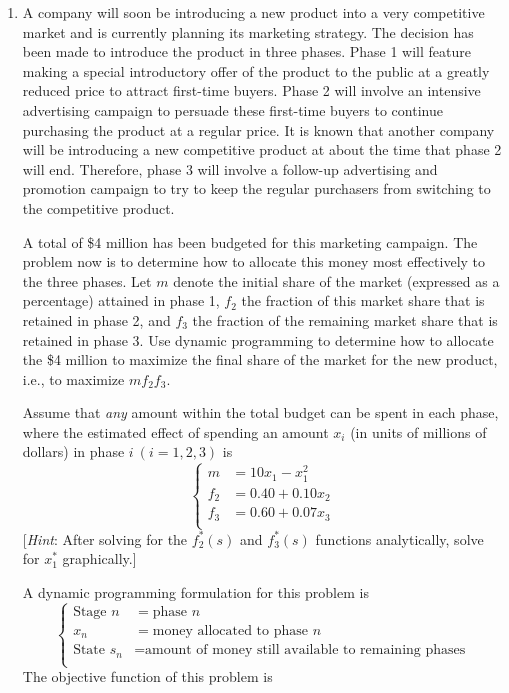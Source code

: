 \documentclass[a4paper]{article}
\begin{document}
\begin{enumerate}
\item A company will soon be introducing a new product into a very competitive market and is currently planning its marketing strategy. The decision has been made to introduce the product in three phases. Phase 1 will feature making a special introductory offer of the product to the public at a greatly reduced price to attract first-time buyers. Phase 2 will involve an intensive advertising campaign to persuade these first-time buyers to continue purchasing the product at a regular price. It is known that another company will be introducing a new competitive product at about the time that phase 2 will end. Therefore, phase 3 will involve a follow-up advertising and promotion campaign to try to keep the regular purchasers from switching to the competitive product.

\hspace*{4ex}A total of \$4 million has been budgeted for this marketing campaign. The problem now is to determine how to allocate this money most effectively to the three phases. Let $m$ denote the initial share of the market (expressed as a percentage) attained in phase 1, $f_2$ the fraction of this market share that is retained in phase 2, and $f_3$ the fraction of the remaining market share that is retained in phase 3. Use dynamic programming to determine how to allocate the \$4 million to maximize the final share of the market for the new product, i.e., to maximize $mf_2f_3$.

\hspace*{4ex}Assume that \textit{any} amount within the total budget can be spent in each phase, where the estimated effect of spending an amount $x_i$ (in units of millions of dollars) in phase $i\ (i = 1, 2, 3)$ is
\begin{equation*}
\left\{\begin{aligned}
m&=10x_1-x_1^2\\
f_2&=0.40+0.10x_2\\
f_3&=0.60+0.07x_3\\
\end{aligned}
\right.
\end{equation*}
[\textit{Hint}: After solving for the $f_2^*(s)$ and $f_3^*(s)$ functions analytically, solve for $x_1^*$ graphically.]

\begin{solution}
	
	A dynamic programming formulation for this problem is
	\begin{equation*}\left\{
		\begin{aligned}
			\text{Stage } n&=\text{phase }n\\
			x_n&=\text{money allocated to phase }n\\
			\text{State } s_n&=\text{amount of money still available to remaining phases}\\
		\end{aligned}\right.
	\end{equation*}
	The objective function of this problem is
	

\end{solution}
\end{enumerate}
\end{document}
